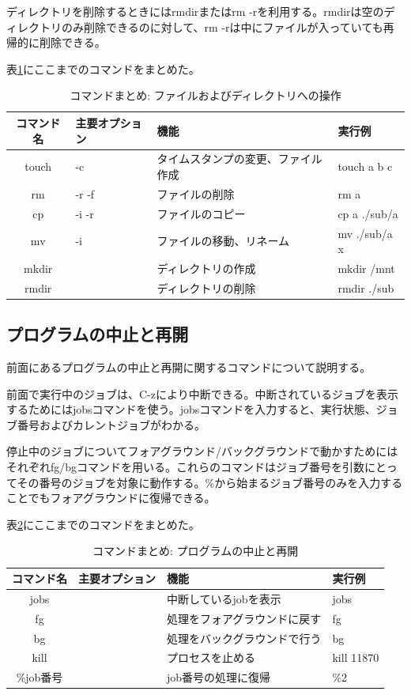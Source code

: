 \documentclass[dvipdfmx,12pt,a4j]{jarticle}
\begin{document}
ディレクトリを削除するときにはrmdirまたはrm -rを利用する。rmdirは空のディレクトリのみ削除できるのに対して、rm -rは中にファイルが入っていても再帰的に削除できる。

表\ref{table:command:file}にここまでのコマンドをまとめた。

\begin{table}[H]
  \caption{コマンドまとめ: ファイルおよびディレクトリへの操作}
  \label{table:command:file}
  \begin{tabular}{|c|l|l|l|}
    \hline
    コマンド名 & 主要オプション & 機能 & 実行例\\
    \hline \hline
    touch & -c & タイムスタンプの変更、ファイル作成 & touch a b c \\
    rm & -r -f & ファイルの削除 & rm a \\ 
    cp & -i -r & ファイルのコピー & cp a ./sub/a \\
    mv & -i & ファイルの移動、リネーム & mv ./sub/a x \\
    mkdir & & ディレクトリの作成 & mkdir /mnt \\
    rmdir & & ディレクトリの削除 & rmdir ./sub \\
    \hline
  \end{tabular}
\end{table}

\subsection{プログラムの中止と再開}
前面にあるプログラムの中止と再開に関するコマンドについて説明する。

前面で実行中のジョブは、C-zにより中断できる。中断されているジョブを表示するためにはjobsコマンドを使う。jobsコマンドを入力すると、実行状態、ジョブ番号およびカレントジョブがわかる。

停止中のジョブについてフォアグラウンド/バックグラウンドで動かすためにはそれぞれfg/bgコマンドを用いる。これらのコマンドはジョブ番号を引数にとってその番号のジョブを対象に動作する。\%から始まるジョブ番号のみを入力することでもフォアグラウンドに復帰できる。

表\ref{table:command:ps}にここまでのコマンドをまとめた。

\begin{table}[H]
  \caption{コマンドまとめ: プログラムの中止と再開}
  \label{table:command:ps}
  \begin{tabular}{|c|l|l|l|}
    \hline
    コマンド名 & 主要オプション & 機能 & 実行例\\
    \hline \hline
    jobs & & 中断しているjobを表示 & jobs \\
    fg & & 処理をフォアグラウンドに戻す & fg \\
    bg & & 処理をバックグラウンドで行う & bg \\
    kill & & プロセスを止める & kill 11870 \\
    \%job番号 & & job番号の処理に復帰 & \%2 \\ 
    \hline
  \end{tabular}
\end{table}
\end{document}
